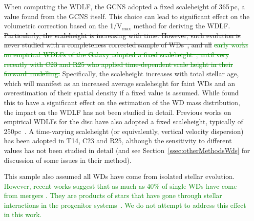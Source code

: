 \documentclass[fleqn,usenatbib]{mnras}
\begin{document}
When computing the WDLF, the GCNS adopted a fixed scaleheight of 365\,pc, a
value found from the GCNS itself. This choice can lead to significant effect
on the volumetric correction based on the 1/V$_{\mathrm{max}}$ method for
deriving the WDLF.
%
\sout{Particularly, the scaleheight is increasing with time.
However, such evolution is never studied with a completeness corrected sample
of WDs~\mbox{\citep{2006AJ....131..571H}}, and all }\textcolor{green}{\sout{early works on empirical WDLFs 
of the Galaxy adopted a fixed scaleheight~\mbox{\citep{2006AJ....131..571H,
2011MNRAS.417...93R, 2019MNRAS.482..715L}}, until very recently with C23 and
R25 who applied time-dependent scale height in their forward modelling.}}
\textcolor{nick}{
Specifically, the scaleheight increases with total stellar age, which will manifest
as an increased average scaleheight for faint WDs and an overestimation of their
spatial density if a fixed value is assumed. While \citet{2016MNRAS.461.2100T} found
this to have a significant effect on the estimation of the WD mass distribution,
the impact on the WDLF has not been studied in detail. Previous works on empirical
WDLFs for the disc have also adopted a fixed scaleheight, typically of 250pc~\citep{2006AJ....131..571H,
2011MNRAS.417...93R, 2019MNRAS.482..715L}.
A time-varying scaleheight (or equivalently, 
vertical velocity dispersion) has been adopted in T14, C23 and R25, although
the sensitivity to different values has not been studied in detail (and see 
Section~\ref{ssec:otherMethodsWds} for discussion of some issues in their method).}

This sample also assumed all WDs have come from isolated stellar evolution.
\textcolor{green}{However, recent works suggest that as much as 40\% of single
WDs have come from mergers \citep{2020A&A...636A..31T, 2020ApJ...898...84K}.
They are products
of stars that have gone through stellar interactions in the progenitor
systems~\citep[e.g.\ ][]{2013A&ARv..21...59I, 2023arXiv231117145H}. We do not
attempt to address this effect in this work.}
\end{document}
